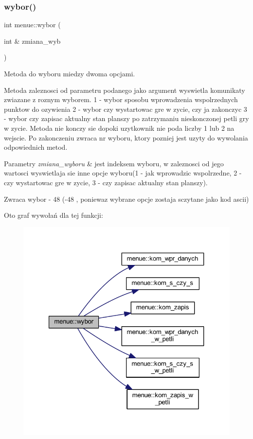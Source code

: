 \subsubsection{\texorpdfstring{wybor()}{wybor()}}
{\footnotesize\ttfamily int menue\+::wybor (\begin{DoxyParamCaption}\item[{int \&}]{zmiana\+\_\+wyb }\end{DoxyParamCaption})\hspace{0.3cm}{\ttfamily [static]}}

Metoda do wyboru miedzy dwoma opcjami.

Metoda zaleznosci od parametru podanego jako argument wyswietla komunikaty zwiazane z roznym wyborem. 1 -\/ wybor sposobu wprowadzenia wspolrzednych punktow do ozywienia 2 -\/ wybor czy wystartowac gre w zycie, czy ja zakonczyc 3 -\/ wybor czy zapisac aktualny stan planszy po zatrzymaniu nieskonczonej petli gry w zycie. Metoda nie konczy sie dopoki uzytkownik nie poda liczby 1 lub 2 na wejscie. Po zakonczeniu zwraca nr wyboru, ktory pozniej jest uzyty do wywolania odpowiednich metod. 
\begin{DoxyParams}{Parametry}
{\em zmiana\+\_\+wyboru} & jest indeksem wyboru, w zaleznosci od jego wartosci wyswietlaja sie inne opcje wyboru(1 -\/ jak wprowadzic wspolrzedne, 2 -\/ czy wystartowac gre w zycie, 3 -\/ czy zapisac aktualny stan planszy). \\
\hline
\end{DoxyParams}
\begin{DoxyReturn}{Zwraca}
wybor -\/ 48 (-\/48 , poniewaz wybrane opcje zostaja sczytane jako kod ascii) 
\end{DoxyReturn}
Oto graf wywołań dla tej funkcji\+:
\nopagebreak
\begin{figure}[H]
\begin{center}
\leavevmode
\includegraphics[width=321pt]{classmenue_af6a59b2891dfcc8df337d3ac11fb767d_cgraph}
\end{center}
\end{figure}

